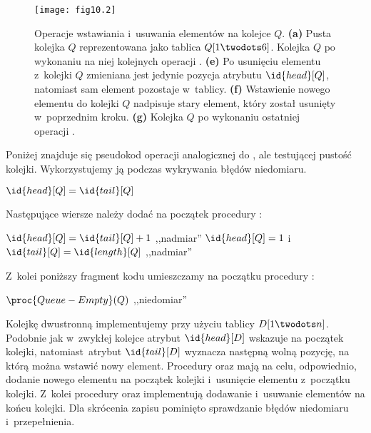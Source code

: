 \begin{figure}[ht]
	\begin{center}
		\texttt{[image: fig10.2]}
	\end{center}
	\caption{Operacje wstawiania i~usuwania elementów na kolejce $Q$. {\sffamily\bfseries(a)} Pusta kolejka $Q$ reprezentowana jako tablica $Q[1\twodots6]$. {\sffamily\bfseries{}} Kolejka $Q$ po wykonaniu na niej kolejnych operacji . {\sffamily\bfseries(e)} Po usunięciu elementu z~kolejki $Q$ zmieniana jest jedynie pozycja atrybutu $\id{head}[Q]$, natomiast sam element pozostaje w~tablicy. {\sffamily\bfseries(f)} Wstawienie nowego elementu do kolejki $Q$ nadpisuje stary element, który został usunięty w~poprzednim kroku. {\sffamily\bfseries(g)} Kolejka $Q$ po wykonaniu ostatniej operacji .} \label{fig:10.1-3}
\end{figure}

\exercise %
Poniżej znajduje się pseudokod operacji analogicznej do , ale testującej pustość kolejki. Wykorzystujemy ją podczas wykrywania błędów niedomiaru.

\begin{codebox}
\li	\If $\id{head}[Q]=\id{tail}[Q]$
\li		\Then \Return {}
\li		\Else \Return {}
\End
\end{codebox}

Następujące wiersze należy dodać na początek procedury :
\begin{codebox}
\zi	\If $\id{head}[Q]=\id{tail}[Q]+1$
\zi		\Then \Error ,,nadmiar''
		\End
\zi	\If $\id{head}[Q]=1$ i~$\id{tail}[Q]=\id{length}[Q]$
\zi		\Then \Error ,,nadmiar''
		\End
\end{codebox}
Z~kolei poniższy fragment kodu umieszczamy na początku procedury :
\begin{codebox}
\zi	\If $\proc{Queue-Empty}(Q)$
\zi		\Then \Error ,,niedomiar''
		\End
\end{codebox}

\exercise %
Kolejkę dwustronną implementujemy przy użyciu tablicy $D[1\twodots n]$. Podobnie jak w~zwykłej kolejce atrybut $\id{head}[D]$ wskazuje na początek kolejki, natomiast~atrybut $\id{tail}[D]$ wyznacza następną wolną pozycję, na którą można wstawić nowy element. Procedury  oraz  mają na celu, odpowiednio, dodanie nowego elementu na początek kolejki i~usunięcie elementu z~początku kolejki. Z~kolei procedury  oraz  implementują dodawanie i~usuwanie elementów na końcu kolejki. Dla skrócenia zapisu pominięto sprawdzanie błędów niedomiaru i~przepełnienia.

